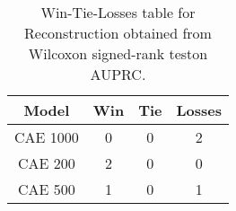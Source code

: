 \begin{table}[H]
\centering
\begin{tabular}{|c|c|c|c|}

\textbf{Model} &  \textbf{Win} &  \textbf{Tie} &  \textbf{Losses} \\
\hline

      CAE 1000 &             0 &             0 &                2 \\
\hline
       CAE 200 &             2 &             0 &                0 \\
\hline
       CAE 500 &             1 &             0 &                1 \\
\hline

\end{tabular}
\caption{Win-Tie-Losses table for Reconstruction obtained from Wilcoxon signed-rank teston AUPRC.}
\label{tab:reconstruction_model_comparison}
\end{table}